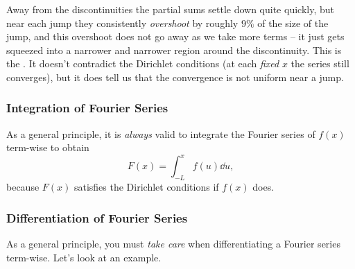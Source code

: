 \documentclass[a4paper]{scrartcl}
\begin{document}
\begin{center}
\end{center}

Away from the discontinuities the partial sums settle down quite quickly, but near each jump they consistently \emph{overshoot} by roughly $9\%$ of the size of the jump, and this overshoot does not go away as we take more terms -- it just gets squeezed into a narrower and narrower region around the discontinuity. This is the . It doesn't contradict the Dirichlet conditions (at each \emph{fixed} $x$ the series still converges), but it does tell us that the convergence is not uniform near a jump.

\subsubsection*{Integration of Fourier Series}

As a general principle, it is \emph{always} valid to integrate the Fourier series of $f(x)$ term-wise to obtain
$$
F(x) = \int_{-L}^x f(u) \dd u,
$$
because $F(x)$ satisfies the Dirichlet conditions if $f(x)$ does.

\subsubsection*{Differentiation of Fourier Series}

As a general principle, you must \emph{take care} when differentiating a Fourier series term-wise. Let's look at an example.
\end{document}

